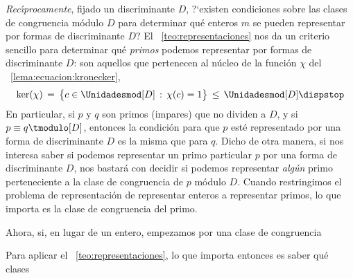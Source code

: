 \emph{Rec\'{\i}procamente}, fijado un discriminante $D$,
?`existen condiciones sobre las clases de congruencia m\'odulo $D$
para determinar qu\'e enteros $m$ se pueden representar por formas de
discriminante $D$?
El \teoname~\ref{teo:representaciones} nos da un criterio sencillo
para determinar qu\'e \emph{primos} podemos representar por formas
de discriminante $D$:
son aquellos que pertenecen al n\'ucleo de la funci\'on $\chi$ del
\lemaname~\ref{lema:ecuacion:kronecker},
\begin{displaymath}
	\ker(\chi)\,=\,\big\{c\in\Unidadesmod[D]\,:\,\chi(c)=1\big\}
		\,\leq\,\Unidadesmod[D]
	\dispstop
\end{displaymath}
%
En particular, si $p$ y $q$ son primos (impares) que no dividen a $D$,
y si $p\equiv q\tmodulo[D]$, entonces la condici\'on para que $p$ est\'e
representado por una forma de discriminante $D$ es la misma que para $q$.
Dicho de otra manera, si nos interesa saber si podemos representar un
primo particular $p$ por una forma de discriminante $D$, nos bastar\'a
con decidir si podemos representar \emph{alg\'un} primo perteneciente a
la clase de congruencia de $p$ m\'odulo $D$.
Cuando restringimos el problema de representaci\'on de representar
enteros a representar primos, lo que importa es la clase de congruencia
del primo.

Ahora, si, en lugar de un entero, empezamos por una clase de congruencia

Para aplicar el \teoname~\ref{teo:representaciones}, lo que importa
entonces es saber qu\'e clases 

